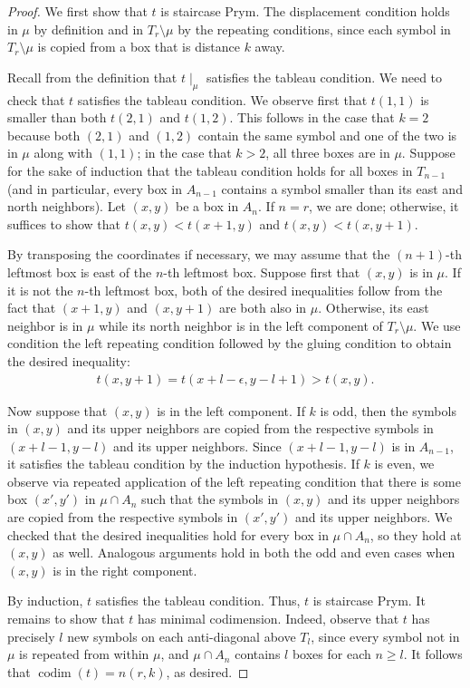 \documentclass[11pt,reqno]{amsart}
\newcommand*{\restrict}[1]{{\mid}_{#1}}
\DeclareMathOperator{\codim}{codim}
\theoremstyle{definition}
\theoremstyle{problem}
\theoremstyle{plain}
\theoremstyle{remark}
\theoremstyle{theorem}
\numberwithin{equation}{section}
\numberwithin{figure}{section}
\begin{document}
\begin{proof}
  We first show that $t$ is staircase Prym.  The displacement
  condition holds in $\mu$ by definition and in $T_r \setminus \mu$ by
  the repeating conditions, since each symbol in $T_r \setminus \mu$
  is copied from a box that is distance $k$ away.

  Recall from the definition that $t\restrict\mu$ satisfies the
  tableau condition.  We need to check that $t$ satisfies the tableau
  condition.  We observe first that $t(1,1)$ is smaller than both
  $t(2,1)$ and $t(1,2)$.  This follows in the case that $k = 2$
  because both $(2,1)$ and $(1,2)$ contain the same symbol and one of
  the two is in $\mu$ along with $(1,1)$; in the case that $k > 2$,
  all three boxes are in $\mu$.  Suppose for the sake of induction
  that the tableau condition holds for all boxes in $T_{n-1}$ (and in
  particular, every box in $A_{n-1}$ contains a symbol smaller than
  its east and north neighbors).  Let $(x,y)$ be a box in $A_n$.  If
  $n = r$, we are done; otherwise, it suffices to show that
  $t(x,y) < t(x+1,y)$ and $t(x,y) < t(x,y+1)$.

  By transposing the coordinates if necessary, we may assume that the
  $(n+1)$-th leftmost box is east of the $n$-th leftmost box.  Suppose
  first that $(x,y)$ is in $\mu$.  If it is not the $n$-th leftmost
  box, both of the desired inequalities follow from the fact that
  $(x+1,y)$ and $(x,y+1)$ are both also in $\mu$.  Otherwise, its east
  neighbor is in $\mu$ while its north neighbor is in the left
  component of $T_r \setminus \mu$.  We use condition the left
  repeating condition followed by the gluing condition to obtain the
  desired inequality:
  \begin{align*}
    t(x,y+1) = t(x+l-\epsilon,y-l+1) > t(x,y).
  \end{align*}

  Now suppose that $(x,y)$ is in the left component.  If $k$ is odd,
  then the symbols in $(x,y)$ and its upper neighbors are copied from
  the respective symbols in $(x+l-1,y-l)$ and its upper neighbors.
  Since $(x+l-1,y-l)$ is in $A_{n-1}$, it satisfies the tableau
  condition by the induction hypothesis.  If $k$ is even, we observe
  via repeated application of the left repeating condition that there
  is some box $(x',y')$ in $\mu \cap A_n$ such that the symbols in
  $(x,y)$ and its upper neighbors are copied from the respective
  symbols in $(x',y')$ and its upper neighbors.  We checked that the
  desired inequalities hold for every box in $\mu \cap A_n$, so they
  hold at $(x,y)$ as well.  Analogous arguments hold in both the odd
  and even cases when $(x,y)$ is in the right component.

  By induction, $t$ satisfies the tableau condition.  Thus, $t$ is
  staircase Prym.  It remains to show that $t$ has minimal
  codimension.  Indeed, observe that $t$ has precisely $l$ new symbols
  on each anti-diagonal above $T_l$, since every symbol not in $\mu$
  is repeated from within $\mu$, and $\mu \cap A_n$ contains $l$ boxes
  for each $n \geq l$.  It follows that $\codim(t) = n(r,k)$, as
  desired.
\end{proof}
\end{document}
